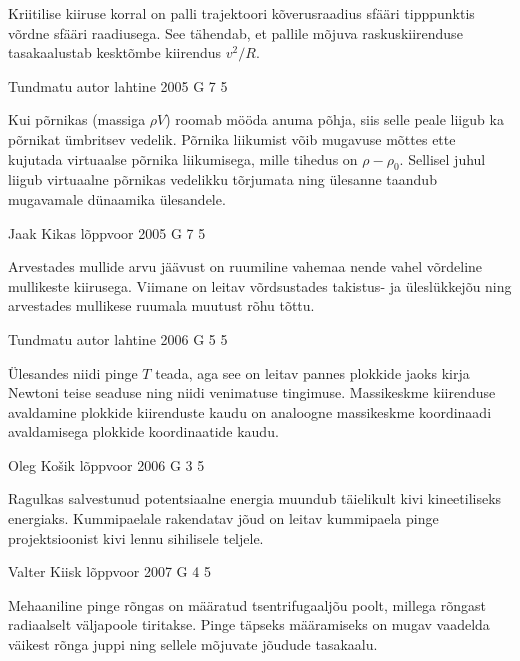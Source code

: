 \documentclass[11pt]{article}
\begin{document}
{{\ifHint
Kriitilise kiiruse korral on palli trajektoori kõverusraadius sfääri tipppunktis võrdne sfääri raadiusega. See tähendab, et pallile mõjuva raskuskiirenduse tasakaalustab kesktõmbe kiirendus $v^2/R$.
\fi
}

{Tundmatu autor} %
{lahtine} %
{2005} %
{G 7} %
{5} %
{

\ifHint
Kui põrnikas (massiga $\rho V$) roomab mööda anuma põhja, siis selle peale liigub ka põrnikat ümbritsev vedelik. Põrnika liikumist võib mugavuse mõttes ette kujutada virtuaalse põrnika liikumisega, mille tihedus on $\rho - \rho_0$. Sellisel juhul liigub virtuaalne põrnikas vedelikku tõrjumata ning ülesanne taandub mugavamale dünaamika ülesandele.
\fi
}

{Jaak Kikas} %
{lõppvoor} %
{2005} %
{G 7} %
{5} %
{

\ifHint
Arvestades mullide arvu jäävust on ruumiline vahemaa nende vahel võrdeline mullikeste kiirusega. Viimane on leitav võrdsustades takistus- ja üleslükkejõu ning arvestades mullikese ruumala muutust rõhu tõttu.
\fi
}

{Tundmatu autor} %
{lahtine} %
{2006} %
{G 5} %
{5} %
{

\ifHint
Ülesandes niidi pinge $T$ teada, aga see on leitav pannes plokkide jaoks kirja Newtoni teise seaduse ning niidi venimatuse tingimuse. Massikeskme kiirenduse avaldamine plokkide kiirenduste kaudu on analoogne massikeskme koordinaadi avaldamisega plokkide koordinaatide kaudu.
\fi
}

{Oleg Košik} %
{lõppvoor} %
{2006} %
{G 3} %
{5} %
{

\ifHint
Ragulkas salvestunud potentsiaalne energia muundub täielikult kivi kineetiliseks energiaks. Kummipaelale rakendatav jõud on leitav kummipaela pinge projektsioonist kivi lennu sihilisele teljele.
\fi
}

{Valter Kiisk} %
{lõppvoor} %
{2007} %
{G 4} %
{5} %
{

\ifHint
Mehaaniline pinge rõngas on määratud tsentrifugaaljõu poolt, millega rõngast radiaalselt väljapoole tiritakse. Pinge täpseks määramiseks on mugav vaadelda väikest rõnga juppi ning sellele mõjuvate jõudude tasakaalu.
\fi
}

}
\end{document}
